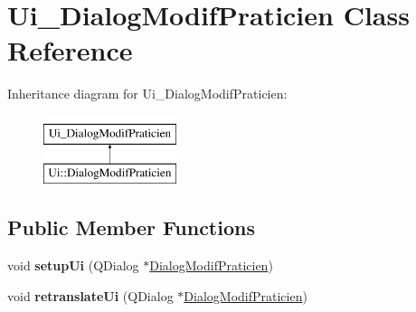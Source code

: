 \hypertarget{classUi__DialogModifPraticien}{\section{Ui\-\_\-\-Dialog\-Modif\-Praticien Class Reference}
\label{classUi__DialogModifPraticien}
}
Inheritance diagram for Ui\-\_\-\-Dialog\-Modif\-Praticien\-:\begin{figure}[H]
\begin{center}
\leavevmode
\includegraphics[height=2.000000cm]{classUi__DialogModifPraticien}
\end{center}
\end{figure}
\subsection*{Public Member Functions}
\begin{DoxyCompactItemize}
\item 
\hypertarget{classUi__DialogModifPraticien_aa39e1af2907fb461561a6f664c27552f}{void {\bfseries setup\-Ui} (Q\-Dialog $\ast$\hyperlink{classDialogModifPraticien}{Dialog\-Modif\-Praticien})}\label{classUi__DialogModifPraticien_aa39e1af2907fb461561a6f664c27552f}

\item 
\hypertarget{classUi__DialogModifPraticien_ac74eb93817e43dccd056b77add66dbf6}{void {\bfseries retranslate\-Ui} (Q\-Dialog $\ast$\hyperlink{classDialogModifPraticien}{Dialog\-Modif\-Praticien})}\label{classUi__DialogModifPraticien_ac74eb93817e43dccd056b77add66dbf6}

\end{DoxyCompactItemize}
